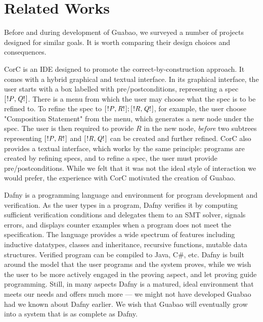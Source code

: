 \documentclass[runningheads]{llncs}
\newcommand{\Conid}[1]{\mathit{#1}}
\let\Conid\mathit
\begin{document}
\section{Related Works}
\label{sec:related-works}

Before and during development of Guabao, we surveyed a number of projects designed for similar goals.
It is worth comparing their design choices and consequences.

CorC \cite{Schaefer:18:CorC,Runge:19:Tool} is an IDE designed to promote the correct-by-construction approach.
It comes with a hybrid graphical and textual interface.
In its graphical interface, the user starts with a box labelled with pre/postconditions, representing a spec \ensuremath{[\mskip1.5mu \mathbin{!}\Conid{P},\Conid{Q}\mathbin{!}\mskip1.5mu]}.
There is a menu from which the user may choose what the spec is to be refined to.
To refine the spec to \ensuremath{[\mskip1.5mu \mathbin{!}\Conid{P},\Conid{R}\mathbin{!}\mskip1.5mu];[\mskip1.5mu \mathbin{!}\Conid{R},\Conid{Q}\mathbin{!}\mskip1.5mu]}, for example, the user choose "Composition Statement" from the menu, which generates a new node under the spec.
The user is then required to provide \ensuremath{\Conid{R}} in the new node, \emph{before} two subtrees representing \ensuremath{[\mskip1.5mu \mathbin{!}\Conid{P},\Conid{R}\mathbin{!}\mskip1.5mu]} and \ensuremath{[\mskip1.5mu \mathbin{!}\Conid{R},\Conid{Q}\mathbin{!}\mskip1.5mu]} can be created and further refined.
CorC also provides a textual interface, which works by the same principle:
programs are created by refining specs,
and to refine a spec, the user must provide pre/postconditions.
While we felt that it was not the ideal style of interaction we would prefer,
the experience with CorC motivated the creation of Guabao.

Dafny \cite{Leino:14:Dafny} is a programming language and environment for program development and verification.
As the user types in a program, Dafny verifies it by computing sufficient verification conditions and delegates them to an SMT solver, signals errors, and displays counter examples when a program does not meet the specification.
The language provides a wide spectrum of features including
inductive datatypes, classes and inheritance, recursive functions, mutable data structures.
Verified program can be compiled to Java, C\#, etc.
Dafny is built around the model that the user programs and the system proves,
while we wish the user to be more actively engaged in the proving aspect, and let proving guide programming.
Still, in many aspects Dafny is a matured, ideal environment that meets our needs and offers much more --- we might not have developed Guabao had we known about Dafny earlier.
We wish that Guabao will eventually grow into a system that is as complete as Dafny.
\end{document}
